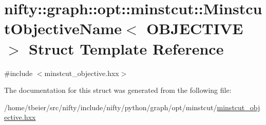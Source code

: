 \hypertarget{structnifty_1_1graph_1_1opt_1_1minstcut_1_1MinstcutObjectiveName}{}\section{nifty\+:\+:graph\+:\+:opt\+:\+:minstcut\+:\+:Minstcut\+Objective\+Name$<$ O\+B\+J\+E\+C\+T\+I\+VE $>$ Struct Template Reference}
\label{structnifty_1_1graph_1_1opt_1_1minstcut_1_1MinstcutObjectiveName}


{\ttfamily \#include $<$minstcut\+\_\+objective.\+hxx$>$}



The documentation for this struct was generated from the following file\+:\begin{DoxyCompactItemize}
\item 
/home/tbeier/src/nifty/include/nifty/python/graph/opt/minstcut/\hyperlink{python_2graph_2opt_2minstcut_2minstcut__objective_8hxx}{minstcut\+\_\+objective.\+hxx}\end{DoxyCompactItemize}
